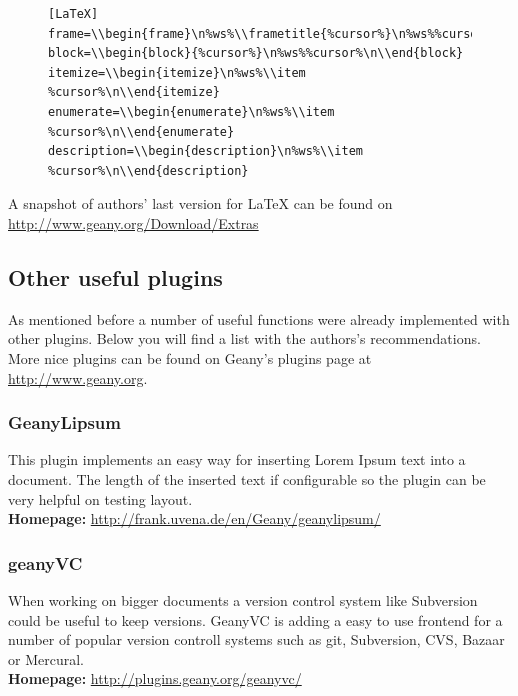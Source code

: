 \documentclass[%
paper=a4,%
fontsize=11pt,%
twoside=false,%
DIV18,
headsepline,
plainheadsepline,
footsepline,
plainfootsepline,
bibliography=totoc,%
listof=totoc,%
BCOR10mm,%
parskip=half,%
openany,%
]{scrartcl}
\begin{document}
\begin{figure}[h!]
\begin{lstlisting}
[LaTeX]
frame=\\begin{frame}\n%ws%\\frametitle{%cursor%}\n%ws%%cursor%\n\\end{frame}
block=\\begin{block}{%cursor%}\n%ws%%cursor%\n\\end{block}
itemize=\\begin{itemize}\n%ws%\\item %cursor%\n\\end{itemize}
enumerate=\\begin{enumerate}\n%ws%\\item %cursor%\n\\end{enumerate}
description=\\begin{description}\n%ws%\\item %cursor%\n\\end{description}
\end{lstlisting}
\end{figure}

A snapshot of authors' last version for LaTeX can be found on
\url{http://www.geany.org/Download/Extras}

\subsection{Other useful plugins}
As mentioned before a number of useful functions were already
implemented with other plugins. Below you will find a list with the
authors's recommendations. More nice plugins can be found on Geany's
plugins page at \url{http://www.geany.org}.

\subsubsection{GeanyLipsum}
This plugin implements an easy way for inserting Lorem Ipsum text into
a document. The length of the inserted text if configurable so the
plugin can be very helpful on testing layout.\\
\textbf{Homepage:} \url{http://frank.uvena.de/en/Geany/geanylipsum/}

\subsubsection{geanyVC}
When working on bigger documents a version control system like
Subversion could be useful to keep versions. GeanyVC is adding a easy
to use frontend for a number of popular version controll systems such
as git, Subversion, CVS, Bazaar or Mercural.\\
\textbf{Homepage:} \url{http://plugins.geany.org/geanyvc/}
\end{document}

